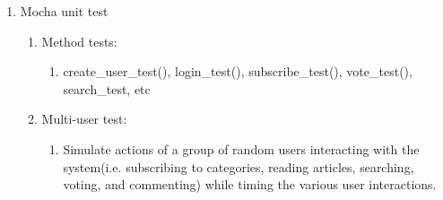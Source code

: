 \documentclass{report}
\begin{document}
\begin{enumerate}
\def\labelenumi{\arabic{enumi}.}
\item
  Mocha unit test

  \begin{enumerate}
  \def\labelenumii{\alph{enumii}.}
  \item
    Method tests:

    \begin{enumerate}
    \def\labelenumiii{\roman{enumiii}.}
    \item
      create\_user\_test(), login\_test(), subscribe\_test(),
      vote\_test(), search\_test, etc
    \end{enumerate}
  \item
    Multi-user test:

    \begin{enumerate}
    \def\labelenumiii{\roman{enumiii}.}
    \item
      Simulate actions of a group of random users interacting with the
      system(i.e. subscribing to categories, reading articles,
      searching, voting, and commenting) while timing the various user
      interactions.
    \end{enumerate}
  \end{enumerate}
\end{enumerate}
\end{document}
